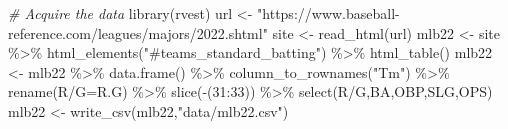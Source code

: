 \documentclass[
  11pt,
]{book}
\newenvironment{Shaded}{\begin{snugshade}}{\end{snugshade}}
\newcommand{\AttributeTok}[1]{\textcolor[rgb]{0.77,0.63,0.00}{#1}}
\newcommand{\CommentTok}[1]{\textcolor[rgb]{0.56,0.35,0.01}{\textit{#1}}}
\newcommand{\DecValTok}[1]{\textcolor[rgb]{0.00,0.00,0.81}{#1}}
\newcommand{\FunctionTok}[1]{\textcolor[rgb]{0.00,0.00,0.00}{#1}}
\newcommand{\NormalTok}[1]{#1}
\newcommand{\OtherTok}[1]{\textcolor[rgb]{0.56,0.35,0.01}{#1}}
\newcommand{\SpecialCharTok}[1]{\textcolor[rgb]{0.00,0.00,0.00}{#1}}
\newcommand{\StringTok}[1]{\textcolor[rgb]{0.31,0.60,0.02}{#1}}
\theoremstyle{definition}
\theoremstyle{definition}
\theoremstyle{definition}
\theoremstyle{definition}
\theoremstyle{remark}
\begin{document}
\begin{Shaded}
\begin{Highlighting}[]
\CommentTok{\# Acquire the data}
\FunctionTok{library}\NormalTok{(rvest)}
\NormalTok{url }\OtherTok{\textless{}{-}} \StringTok{"https://www.baseball{-}reference.com/leagues/majors/2022.shtml"}
\NormalTok{site }\OtherTok{\textless{}{-}} \FunctionTok{read\_html}\NormalTok{(url)}
\NormalTok{mlb22 }\OtherTok{\textless{}{-}}\NormalTok{ site }\SpecialCharTok{\%\textgreater{}\%} \FunctionTok{html\_elements}\NormalTok{(}\StringTok{"\#teams\_standard\_batting"}\NormalTok{) }\SpecialCharTok{\%\textgreater{}\%} \FunctionTok{html\_table}\NormalTok{()}
\NormalTok{mlb22 }\OtherTok{\textless{}{-}}\NormalTok{ mlb22 }\SpecialCharTok{\%\textgreater{}\%} \FunctionTok{data.frame}\NormalTok{() }\SpecialCharTok{\%\textgreater{}\%} \FunctionTok{column\_to\_rownames}\NormalTok{(}\StringTok{"Tm"}\NormalTok{) }\SpecialCharTok{\%\textgreater{}\%}
  \FunctionTok{rename}\NormalTok{(}\StringTok{\textasciigrave{}}\AttributeTok{R/G}\StringTok{\textasciigrave{}}\OtherTok{=}\NormalTok{R.G) }\SpecialCharTok{\%\textgreater{}\%} \FunctionTok{slice}\NormalTok{(}\SpecialCharTok{{-}}\NormalTok{(}\DecValTok{31}\SpecialCharTok{:}\DecValTok{33}\NormalTok{)) }\SpecialCharTok{\%\textgreater{}\%} \FunctionTok{select}\NormalTok{(}\StringTok{\textasciigrave{}}\AttributeTok{R/G}\StringTok{\textasciigrave{}}\NormalTok{,BA,OBP,SLG,OPS)}
\NormalTok{mlb22 }\OtherTok{\textless{}{-}} \FunctionTok{write\_csv}\NormalTok{(mlb22,}\StringTok{"data/mlb22.csv"}\NormalTok{)}
\end{Highlighting}
\end{Shaded}
\end{document}
